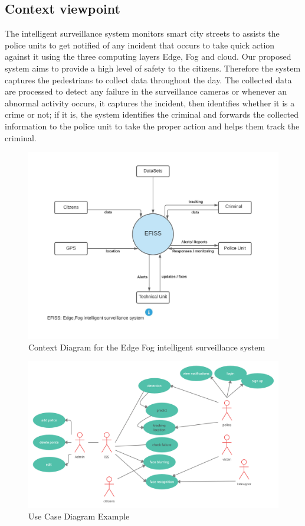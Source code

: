 \documentclass[12pt]{article}
\begin{document}
\subsection{ Context viewpoint}
The intelligent surveillance system monitors smart city streets to assists the police units to get notified of any incident that occurs to take quick action against it using the three computing layers Edge, Fog and cloud. Our proposed system aims to provide a high level of safety to the citizens. Therefore the system captures the pedestrians to collect data throughout the day. The collected data are processed to detect any failure in the surveillance cameras or whenever an abnormal activity occurs, it captures the incident, then identifies whether it is a crime or not; if it is, the system identifies the criminal and forwards the collected information to the police unit to take the proper action and helps them track the criminal.

\begin{figure}[htbp]
\centering
\includegraphics[width=0.8\linewidth]{contextdiagram.jpeg}
\caption{Context Diagram for the Edge Fog intelligent surveillance system}
\label{fig:ctx}
\end{figure}
\FloatBarrier

\begin{figure}[htbp]
\centering
\includegraphics[width=0.9\linewidth]{survillienceusecase.png}
\caption{Use Case Diagram Example}
\label{fig:ucase}
\end{figure}
\FloatBarrier
\end{document}
